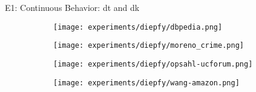 \begin{frame}[fragile]{E1: Continuous Behavior: \acrshort{dt} and \acrshort{dk}}
  \begin{figure}[!htp]
    \centering
    \begin{subfigure}[t]{0.45\textwidth}
     \texttt{[image: experiments/diepfy/dbpedia.png]}
    \end{subfigure}\hfill
    \begin{subfigure}[t]{0.45\textwidth}
     \texttt{[image: experiments/diepfy/moreno\_crime.png]}
    \end{subfigure}
    \vspace{0.5cm}
  
    \begin{subfigure}[t]{0.45\textwidth}
     \texttt{[image: experiments/diepfy/opsahl-ucforum.png]}
    \end{subfigure}\hfill
    \begin{subfigure}[t]{0.45\textwidth}
      \texttt{[image: experiments/diepfy/wang-amazon.png]}
     \end{subfigure}
   \end{figure}
  \end{frame}



